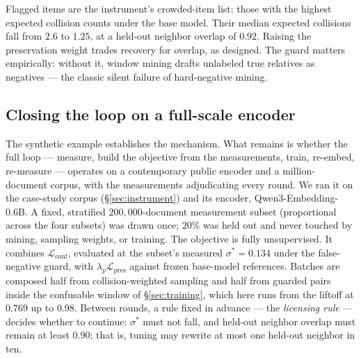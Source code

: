 \documentclass[11pt,letterpaper]{article}
\newcommand{\sstar}{\sigma^{*}}
\begin{document}
Flagged items are the instrument's crowded-item list: those with the
highest expected collision counts under the base model. Their median
expected collisions fall from $2.6$ to $1.25$, at a held-out neighbor
overlap of $0.92$. Raising the preservation weight trades recovery for
overlap, as designed. The guard matters empirically: without it,
window mining drafts unlabeled true relatives as negatives --- the classic
silent failure of hard-negative mining.

\subsection{Closing the loop on a full-scale encoder}
\label{sec:loop}

The synthetic example establishes the mechanism. What remains is whether
the full loop --- measure, build the objective from the measurements,
train, re-embed, re-measure --- operates on a contemporary public encoder
and a million-document corpus, with the measurements adjudicating every
round. We ran it on the case-study corpus (\S\ref{sec:instrument}) and its
encoder, Qwen3-Embedding-0.6B. A fixed, stratified
$200{,}000$-document measurement subset (proportional across the four
subsets) was drawn once; $20\%$ was held out and never touched by mining,
sampling weights, or training. The objective is fully unsupervised. It
combines $\mathcal L_{\mathrm{conf}}$, evaluated at the subset's measured
$\sstar = 0.134$ under the false-negative guard, with $\lambda_p \mathcal
L_{\mathrm{pres}}$ against frozen base-model references. Batches are
composed half from collision-weighted sampling and half from guarded pairs
inside the confusable window of \S\ref{sec:training}, which here runs from
the liftoff at $0.769$ up to $0.98$. Between rounds, a rule fixed in
advance --- the \emph{licensing rule} --- decides whether to continue:
$\sstar$ must not fall, and held-out neighbor overlap must remain at least
$0.90$; that is, tuning may rewrite at most one held-out neighbor in ten.
\end{document}
